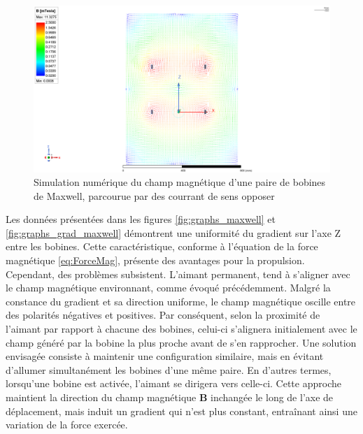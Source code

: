 \documentclass{article}
\begin{document}
        
\begin{figure}[H] %
      
            \centering
            \includegraphics[width=15cm]{Images/bobineMaxewll1.png}
       
        \caption{Simulation numérique du champ magnétique d'une paire de bobines de Maxwell, parcourue par des courrant de sens opposer}
        \label{fig:GradMaxwell}
    \end{figure}
\noindent
Les données présentées dans les figures \ref{fig:graphs_maxwell} et \ref{fig:graphs_grad_maxwell} démontrent une uniformité du gradient sur l'axe Z entre les bobines. Cette caractéristique, conforme à l'équation de la force magnétique  \ref{eq:ForceMag}, présente des avantages pour la propulsion.\\
Cependant, des problèmes subsistent. L'aimant permanent, tend à s'aligner avec le champ magnétique environnant, comme évoqué précédemment. Malgré la constance du gradient et sa direction uniforme, le champ magnétique oscille entre des polarités négatives et positives. Par conséquent, selon la proximité de l'aimant par rapport à chacune des bobines, celui-ci s'alignera initialement avec le champ généré par la bobine la plus proche avant de s'en rapprocher. Une solution envisagée consiste à maintenir une configuration similaire, mais en évitant d'allumer simultanément les bobines d'une même paire. En d'autres termes, lorsqu'une bobine est activée, l'aimant se dirigera vers celle-ci. Cette approche maintient la direction du champ magnétique $\mathbf{B}$ inchangée le long de l'axe de déplacement, mais induit un gradient qui n'est plus constant, entraînant ainsi une variation de la force exercée.
\end{document}
